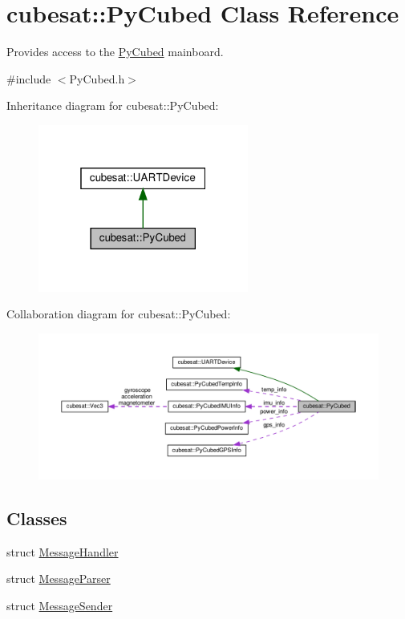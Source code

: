 \hypertarget{classcubesat_1_1PyCubed}{}\section{cubesat\+:\+:Py\+Cubed Class Reference}
\label{classcubesat_1_1PyCubed}


Provides access to the \hyperlink{classcubesat_1_1PyCubed}{Py\+Cubed} mainboard.  




{\ttfamily \#include $<$Py\+Cubed.\+h$>$}



Inheritance diagram for cubesat\+:\+:Py\+Cubed\+:\nopagebreak
\begin{figure}[H]
\begin{center}
\leavevmode
\includegraphics[width=196pt]{classcubesat_1_1PyCubed__inherit__graph}
\end{center}
\end{figure}


Collaboration diagram for cubesat\+:\+:Py\+Cubed\+:
\nopagebreak
\begin{figure}[H]
\begin{center}
\leavevmode
\includegraphics[width=350pt]{classcubesat_1_1PyCubed__coll__graph}
\end{center}
\end{figure}
\subsection*{Classes}
\begin{DoxyCompactItemize}
\item 
struct \hyperlink{structcubesat_1_1PyCubed_1_1MessageHandler}{Message\+Handler}
\item 
struct \hyperlink{structcubesat_1_1PyCubed_1_1MessageParser}{Message\+Parser}
\item 
struct \hyperlink{structcubesat_1_1PyCubed_1_1MessageSender}{Message\+Sender}
\end{DoxyCompactItemize}
